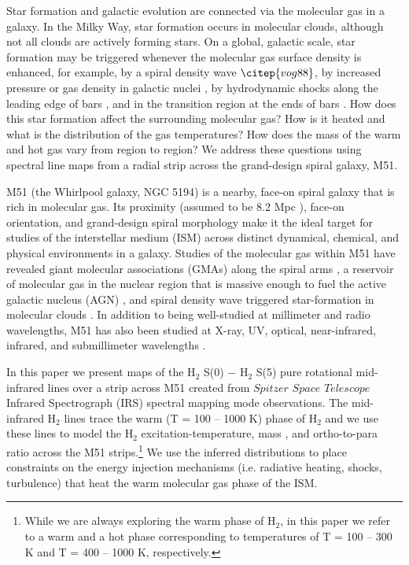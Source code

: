 \documentclass[12pt,preprint]{aastex}
\begin{document}
Star formation and galactic evolution are connected via the molecular
gas in a galaxy.  In the Milky Way, star formation occurs
in molecular clouds, although not all clouds
are actively forming stars.  On a global, galactic scale, star
formation may be triggered whenever the molecular gas surface density
is enhanced, for example, by a spiral density wave $\citep{vog88}$, by
increased pressure or gas density in galactic nuclei \citep{you91, sak99,
she05}, by hydrodynamic shocks along the leading edge of bars
\citep{she00, she02}, and in the transition region at the ends of bars
\citep{kl91,she02}.  How does this star formation affect the
surrounding molecular gas?  How is it heated and what is the
distribution of the gas temperatures?  How does the mass of the warm
and hot gas vary from region to region?  We address these questions
using spectral line maps from a radial strip across the 
grand-design spiral galaxy, M51.

M51 (the Whirlpool galaxy, NGC 5194) is a nearby,
face-on spiral galaxy that is rich in molecular gas.  Its proximity
(assumed to be 8.2 Mpc \citep{tul88}), face-on orientation, and
grand-design spiral morphology make it the ideal target for
studies of the interstellar medium (ISM) across distinct dynamical,
chemical, and physical environments in a galaxy.  Studies of the
molecular gas within M51 have revealed giant molecular associations
(GMAs) along the spiral arms \citep{vog88,ran90,aal99}, a reservoir 
of molecular gas in the nuclear region that is massive enough 
to fuel the active galactic nucleus (AGN) \citep{sco98}, and spiral density wave 
triggered star-formation in molecular clouds \citep{vog88}.
In addition to being well-studied at millimeter and radio wavelengths,
M51 has also been studied at X-ray, UV, optical, near-infrared,
infrared, and submillimeter wavelengths \citep{pal85, ter98, sco01, cal05, mat04, mei05}.  
  
In this paper we present maps of the  
H$_2$ S(0) $-$ H$_2$ S(5) pure rotational 
mid-infrared lines over a strip across M51 
created from $Spitzer$ $Space$ $Telescope$ 
Infrared Spectrograph (IRS) spectral mapping mode observations.
The mid-infrared H$_2$ lines trace the warm (T = 100 -- 1000 K) phase 
of H$_2$ and we use these lines to model the H$_2$ 
 excitation-temperature, mass \citep{rig02, hig06}, and ortho-to-para ratio 
 \citep{neu98, neu06} across the M51 strips.\footnote{While we 
 are always exploring the warm phase of H$_2$, in this paper 
 we refer to a warm and a hot phase corresponding to 
 temperatures of T = 100 -- 300 K and T = 400 -- 1000 K, 
 respectively.}  We use the inferred distributions to  place constraints 
 on the energy injection mechanisms (i.e. radiative heating, 
 shocks, turbulence) that heat the warm molecular gas 
 phase of the ISM.
\end{document}
